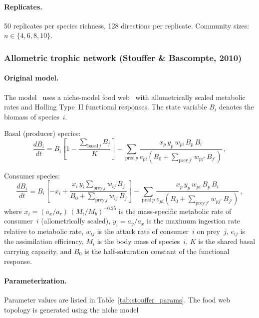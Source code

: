 \documentclass[pdflatex,sn-mathphys-num]{sn-jnl}%
\begin{document}
\paragraph{Replicates.} 50 replicates per species richness, 128 directions per replicate. Community sizes: $n \in \{4, 6, 8, 10\}$.

\subsubsection{Allometric trophic network (Stouffer \& Bascompte, 2010)}
\label{sec:si_stouffer}

\paragraph{Original model.} The model~\cite{stouffer_understanding_2010} uses a niche-model food web~\cite{williams_simple_2000} with allometrically scaled metabolic rates and Holling Type~II functional responses. The state variable $B_i$ denotes the biomass of species~$i$.

Basal (producer) species:
\begin{equation}\label{eq:stouffer_basal}
 \frac{dB_i}{dt}
 = B_i\!\left[
  1 - \frac{\sum_{\text{basal}\,j} B_j}{K}
 \right]
 - \sum_{\text{pred}\,p}
 \frac{x_p\,y_p\,w_{pi}\,B_p\,B_i}
   {e_{pi}\!\left(B_0 + \sum_{\text{prey}\,j'} w_{pj'}\,B_{j'}\right)}
 \,,
\end{equation}

Consumer species:
\begin{equation}\label{eq:stouffer_consumer}
 \frac{dB_i}{dt}
 = B_i\!\left[
  -x_i
 + \frac{x_i\,y_i \sum_{\text{prey}\,j} w_{ij}\,B_j}
   {B_0 + \sum_{\text{prey}\,j} w_{ij}\,B_j}
 \right]
 - \sum_{\text{pred}\,p}
 \frac{x_p\,y_p\,w_{pi}\,B_p\,B_i}
   {e_{pi}\!\left(B_0 + \sum_{\text{prey}\,j'} w_{pj'}\,B_{j'}\right)}
 \,,
\end{equation}
where $x_i = (a_x / a_r)\,(M_i / M_b)^{-0.25}$ is the mass-specific metabolic rate of consumer~$i$ (allometrically scaled), $y_i = a_y / a_x$ is the maximum ingestion rate relative to metabolic rate, $w_{ij}$ is the attack rate of consumer~$i$ on prey~$j$, $e_{ij}$ is the assimilation efficiency, $M_i$ is the body mass of species~$i$, $K$ is the shared basal carrying capacity, and $B_0$ is the half-saturation constant of the functional response.

\paragraph{Parameterization.} Parameter values are listed in Table~\ref{tab:stouffer_params}. The food web topology is generated using the niche model~\cite{williams_simple_2000}
\end{document}
